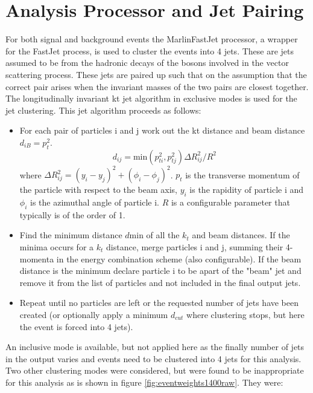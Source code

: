 \section{Analysis Processor and Jet Pairing} \label{sec:jetpairing}

For both signal and background events the MarlinFastJet processor, a wrapper for the FastJet \cite{Cacciari:2011ma} process, is used to cluster the events into 4 jets. These are  jets assumed to be from the hadronic decays of the bosons involved in the vector scattering process.  These jets are paired up such that on the assumption that the correct pair arises when the invariant masses of the two pairs are closest together. The longitudinally invariant kt jet algorithm in exclusive modes is used for the jet clustering.
This jet algorithm proceeds as follows:

\begin{itemize}
\item For each pair of particles i and j work out the kt distance and beam distance $d_{iB} = p_{t}^{2}$.
\begin{equation}
d_{ij} = \text{min}(p_{ti}^{2}, p_{tj}^{2}){\Delta}R^{2}_{ij}/R^{2}
\end{equation}
where ${\Delta}R^{2}_{ij} = (y_{i} - y_{j})^2 + (\phi_{i} - \phi_{j})^2$.  $p_{t}$ is the transverse momentum of the particle with respect to the beam axis, $y_{i}$ is the rapidity of particle i and $\phi_{i}$ is the azimuthal angle of particle i. $R$ is a configurable parameter that typically is of the order of 1.
\item Find the minimum distance $d\text{min}$ of all the $k_{t}$ and beam distances. If the minima occurs for a $k_{t}$ distance, merge particles i and j, summing their 4-momenta in the energy combination scheme (also configurable). If the beam distance is the minimum declare particle i to be apart of the "beam" jet and remove it from the list of particles and not included in the final output jets.
\item Repeat until no particles are left or the requested number of jets have been created (or optionally apply a minimum $d_{cut}$ where clustering stops, but here the event is forced into 4 jets).
\end{itemize}

An inclusive mode is available, but not applied here as the finally number of jets in the output varies and events need to be clustered into 4 jets for this analysis.  Two other clustering modes were considered, but were found to be inappropriate for this analysis as is shown in figure \ref{fig:eventweights1400raw}. They were:

